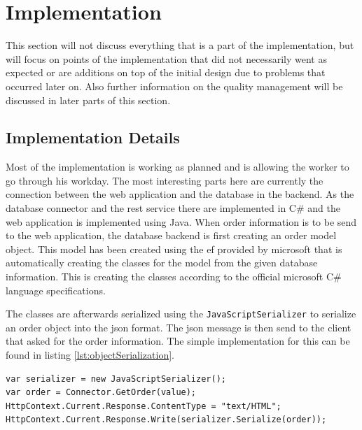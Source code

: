 \section{Implementation}
This section will not discuss everything that is a part of the implementation, but will focus on points of the implementation that did not necessarily went as expected or are additions on top of the initial design due to problems that occurred later on. Also further information on the quality management will be discussed in later parts of this section.

\subsection{Implementation Details}
Most of the implementation is working as planned and is allowing the worker to go through his workday. The most interesting parts here are currently the connection between the web application and the database in the backend. As the database connector and the rest service there are implemented in C\# and the web application is implemented using Java. When order information is to be send to the web application, the database backend is first creating an order model object. This model has been created using the \gls{ef} provided by microsoft that is automatically creating the classes for the model from the given database information. This is creating the classes according to the official microsoft C\# language specifications. \citep{manual:csSpecification} 

The classes are afterwards serialized using the \texttt{JavaScriptSerializer} to \gls{serialize} an order object into the \gls{json} format. The \gls{json} message is then send to the client that asked for the order information. The simple implementation for this can be found in listing \ref{lst:objectSerialization}.

\lstset{language=[Sharp]C}
\begin{lstlisting}[frame=single, caption=C\# Object Serialization, label=lst:objectSerialization]
var serializer = new JavaScriptSerializer();
var order = Connector.GetOrder(value);
HttpContext.Current.Response.ContentType = "text/HTML";
HttpContext.Current.Response.Write(serializer.Serialize(order));
\end{lstlisting}

